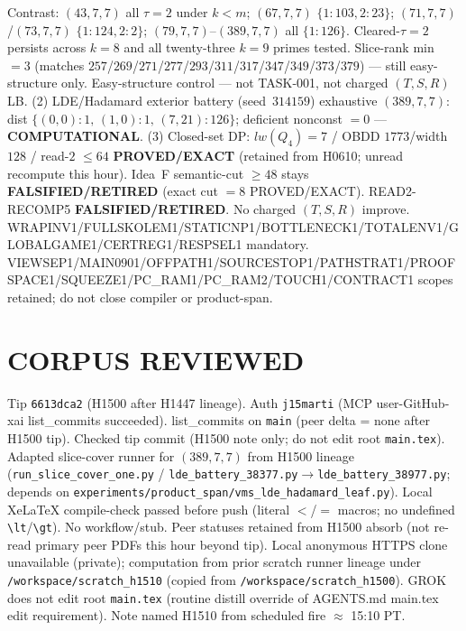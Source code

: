 \documentclass[11pt]{article}
\begin{document}
Contrast: $(43,7,7)$ all $\tau{=}2$ under $k{<}m$; $(67,7,7)$ $\{1{:}103,2{:}23\}$;
$(71,7,7)$/$(73,7,7)$ $\{1{:}124,2{:}2\}$; $(79,7,7)$--$(389,7,7)$ all $\{1{:}126\}$.
Cleared-$\tau{=}2$ persists across $k{=}8$ and all twenty-three $k{=}9$ primes tested.
Slice-rank min $=3$ (matches $257$/$269$/$271$/$277$/$293$/$311$/$317$/$347$/$349$/$373$/$379$) --- still easy-structure only.
Easy-structure control --- not TASK-001, not charged $(T,S,R)$ LB.
(2) LDE/Hadamard exterior battery (seed~$314159$) exhaustive $(389,7,7)$:
dist $\{(0,0){:}1,\,(1,0){:}1,\,(7,21){:}126\}$; deficient nonconst $=0$ --- \textbf{COMPUTATIONAL}.
(3) Closed-set DP: $lw(Q_4)=7$ / OBDD $1773$/width $128$ / read-$2$ $\le64$
\textbf{PROVED/EXACT} (retained from H0610; unread recompute this hour).
Idea~F semantic-cut $\ge48$ stays \textbf{FALSIFIED/RETIRED} (exact cut $=8$ PROVED/EXACT).
READ2-RECOMP5 \textbf{FALSIFIED/RETIRED}. No charged $(T,S,R)$ improve.
WRAPINV1/FULLSKOLEM1/STATICNP1/BOTTLENECK1/TOTALENV1/GLOBALGAME1/CERTREG1/RESPSEL1 mandatory.
VIEWSEP1/MAIN0901/OFFPATH1/SOURCESTOP1/PATHSTRAT1/PROOFSPACE1/SQUEEZE1/PC\_RAM1/PC\_RAM2/TOUCH1/CONTRACT1 scopes retained; do not close compiler or product-span.

\section*{CORPUS REVIEWED}
Tip \texttt{6613dca2} (H1500 after H1447 lineage). Auth \texttt{j15marti} (MCP user-GitHub-xai list\_commits succeeded).
list\_commits on \texttt{main} (peer delta = none after H1500 tip).
Checked tip commit (H1500 note only; do not edit root \texttt{main.tex}).
Adapted slice-cover runner for $(389,7,7)$ from H1500 lineage
(\texttt{run\_slice\_cover\_one.py} / \texttt{lde\_battery\_38377.py}$\to$\texttt{lde\_battery\_38977.py};
depends on \texttt{experiments/product\_span/vms\_lde\_hadamard\_leaf.py}).
Local XeLaTeX compile-check passed before push (literal $<$/$=$ macros; no undefined \texttt{\textbackslash lt}/\texttt{\textbackslash gt}).
No workflow/stub. Peer statuses retained from H1500 absorb (not re-read primary peer PDFs this hour beyond tip).
Local anonymous HTTPS clone unavailable (private);
computation from prior scratch runner lineage under \texttt{/workspace/scratch\_h1510}
(copied from \texttt{/workspace/scratch\_h1500}).
GROK does not edit root \texttt{main.tex} (routine distill override of AGENTS.md main.tex edit requirement).
Note named H1510 from scheduled fire $\approx$ 15:10 PT.
\end{document}
